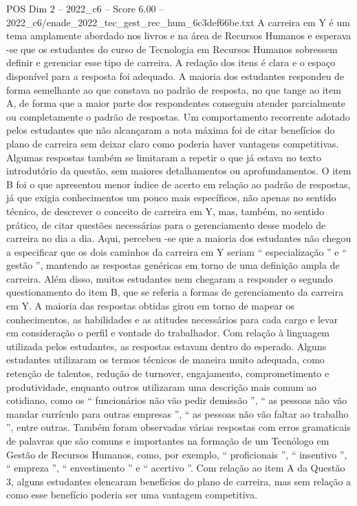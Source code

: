 \begin{textsample}{POS Dim 2 – 2022\_c6 – Score 6.00 – 2022\_c6/enade\_2022\_tec\_gest\_rec\_hum\_6c3def66be.txt}
A carreira em Y é um tema amplamente abordado nos livros e na área de Recursos Humanos e esperava -se que os estudantes do curso de Tecnologia em Recursos Humanos sobressem definir e gerenciar esse tipo de carreira.
A redação dos itens é clara e o espaço disponível para a resposta foi adequado.
A maioria dos estudantes respondeu de forma semelhante ao que constava no padrão de resposta, no que tange ao item A, de forma que a maior parte dos respondentes conseguiu atender parcialmente ou completamente o padrão de respostas.
Um comportamento recorrente adotado pelos estudantes que não alcançaram a nota máxima foi de citar benefícios do plano de carreira sem deixar claro como poderia haver vantagens competitivas.
Algumas respostas também se limitaram a repetir o que já estava no texto introdutório da questão, sem maiores detalhamentos ou aprofundamentos.
O item B foi o que apresentou menor índice de acerto em relação ao padrão de respostas, já que exigia conhecimentos um pouco mais específicos, não apenas no sentido técnico, de descrever o conceito de carreira em Y, mas, também, no sentido prático, de citar questões necessárias para o gerenciamento desse modelo de carreira no dia a dia.
Aqui, percebeu -se que a maioria dos estudantes não chegou a especificar que os dois caminhos da carreira em Y seriam “ especialização ” e “ gestão ”, mantendo as respostas genéricas em torno de uma definição ampla de carreira.
Além disso, muitos estudantes nem chegaram a responder o segundo questionamento do item B, que se referia a formas de gerenciamento da carreira em Y.
A maioria das respostas obtidas girou em torno de mapear os conhecimentos, as habilidades e as atitudes necessários para cada cargo e levar em consideração o perfil e vontade do trabalhador.
Com relação à linguagem utilizada pelos estudantes, as respostas estavam dentro do esperado.
Alguns estudantes utilizaram os termos técnicos de maneira muito adequada, como retenção de talentos, redução de turnover, engajamento, comprometimento e produtividade, enquanto outros utilizaram uma descrição mais comum ao cotidiano, como os “ funcionários não vão pedir demissão ”, “ as pessoas não vão mandar currículo para outras empresas ”, “ as pessoas não vão faltar ao trabalho ”, entre outras.
Também foram observadas várias respostas com erros gramaticais de palavras que são comuns e importantes na formação de um Tecnólogo em Gestão de Recursos Humanos, como, por exemplo, “ proficionais ”, “ insentivo ”, “ empreza ”, “ envestimento ” e “ acertivo ”.
Com relação ao item A da Questão 3, alguns estudantes elencaram benefícios do plano de carreira, mas sem relação a como esse benefício poderia ser uma vantagem competitiva.

\end{textsample}
